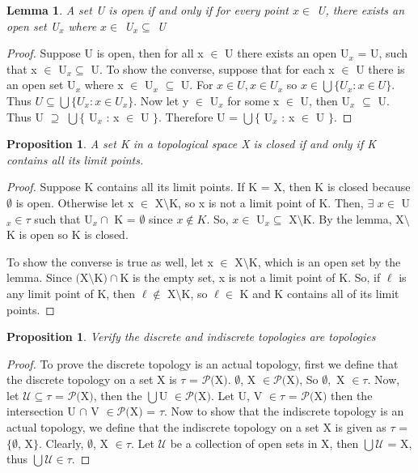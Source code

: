 \documentclass{amsart}
\theoremstyle{plain}
\newtheorem{lemma}[theorem]{Lemma}
\newtheorem{proposition}[theorem]{Proposition}
\theoremstyle{definition}
\theoremstyle{remark}
\begin{document}
	\begin{lemma}
	A set U is open if and only if for every point $x \in$ U, there exists an open set U$_x$ where $x \in $ U$_x \subseteq$ U
	\end{lemma}
	\begin{proof} Suppose U is open, then for all x $\in$ U there exists an open U$_x$ = U, such that x $\in$ U$_x \subseteq$ U.
	\newline
	To show the converse, suppose that for each x $\in$ U there is an open set U$_x$ where x $\in$ U$_x$ $\subseteq$ U. For $x \in U, x \in U_x$ so $x \in \bigcup \lbrace U_x : x \in U \rbrace$. Thus $U \subseteq \bigcup \lbrace U_x : x \in U_x \rbrace$. Now let y $\in$ U$_x$ for some x $\in$ U, then U$_x$ $\subseteq$ U. Thus U $\supseteq$ $\bigcup \lbrace$ U$_x$ : x $\in$ U $\rbrace$. Therefore U = $\bigcup \lbrace$ U$_x$ : x $\in$ U $\rbrace$.
	\end{proof}

	\begin{proposition}
		A set K in a topological space X is closed if and only if K contains all its limit points.
	\end{proposition}
	\begin{proof} Suppose K contains all its limit points.
	If K = X, then K is closed because $\emptyset$ is open.	Otherwise let x $\in$ X$\setminus$K, so x is not a limit point of K.	Then, $\exists$ $x \in$ U$_x \in \tau$ such that U$_x \cap$ K = $\emptyset$ since $x \not\in K$.	So, $x \in $ U$_x \subseteq$ X$\setminus$K.	By the lemma, X$\setminus$K is open so K is closed.

	To show the converse is true as well, let x $\in$ X$\setminus$K, which is an open set by the lemma. Since $($X$\setminus$K$)\cap$K is the empty set, x is not a limit point of K. So, if $\ell$ is any limit point of K, then $\ell \not\in$ X$\setminus$K, so $\ell \in$ K and K contains all of its limit points.
	\end{proof}

	\begin{proposition}
	Verify the discrete and indiscrete topologies are topologies
	\end{proposition}
	\begin{proof} To prove the discrete topology is an actual topology, first we define that the discrete topology on a set X is $\tau$ = $\mathcal{P}($X$)$.	$\emptyset$, X $\in \mathcal{P}($X$)$, So $\emptyset,$ X $\in \tau$. Now, let $\mathcal{U} \subseteq \tau$ = $\mathcal{P}($X$)$, then the $\bigcup$U $\in \mathcal{P}($X$)$. Let U, V $\in \tau$ = $\mathcal{P}($X$)$ then the intersection U $\cap$ V $\in \mathcal{P}($X$)$ = $\tau$. Now to show that the indiscrete topology is an actual topology, we define that the indiscrete topology on a set X is given as $\tau$ = $\lbrace \emptyset$, X$\rbrace$. Clearly, $\emptyset$, X $\in \tau$. Let $\mathcal{U}$ be a collection of open sets in X, then $\bigcup \mathcal{U}$ = X, thus $\bigcup \mathcal{U} \in \tau$.
	\end{proof}
\end{document}
